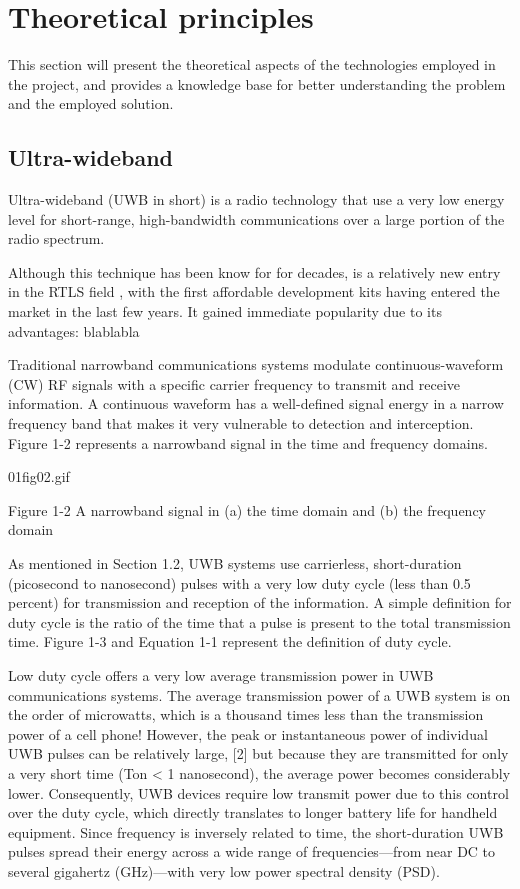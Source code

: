 \section{Theoretical principles}\label{sec:theory}
This section will present the theoretical aspects of the technologies employed in the project, and provides a knowledge base for better understanding the problem and the employed solution.


\subsection{Ultra-wideband}
Ultra-wideband (UWB in short) is a radio technology that use a very low energy level for short-range, high-bandwidth communications over a large portion of the radio spectrum.


Although this technique has been know for for decades, is a relatively new entry in the RTLS field \cite{uwb1}, with the first affordable development kits having entered the market in the last few years.
It gained immediate popularity due to its advantages: blablabla


Traditional narrowband communications systems modulate continuous-waveform (CW) RF signals with a specific carrier frequency to transmit and receive information. A continuous waveform has a well-defined signal energy in a narrow frequency band that makes it very vulnerable to detection and interception. Figure 1-2 represents a narrowband signal in the time and frequency domains.


      01fig02.gif

Figure 1-2 A narrowband signal in (a) the time domain and (b) the frequency domain

As mentioned in Section 1.2, UWB systems use carrierless, short-duration (picosecond to nanosecond) pulses with a very low duty cycle (less than 0.5 percent) for transmission and reception of the information. A simple definition for duty cycle is the ratio of the time that a pulse is present to the total transmission time. Figure 1-3 and Equation 1-1 represent the definition of duty cycle.

Low duty cycle offers a very low average transmission power in UWB communications systems. The average transmission power of a UWB system is on the order of microwatts, which is a thousand times less than the transmission power of a cell phone! However, the peak or instantaneous power of individual UWB pulses can be relatively large,
      [2]
     but because they are transmitted for only a very short time (Ton < 1 nanosecond), the average power becomes considerably lower. Consequently, UWB devices require low transmit power due to this control over the duty cycle, which directly translates to longer battery life for handheld equipment. Since frequency is inversely related to time, the short-duration UWB pulses spread their energy across a wide range of frequencies—from near DC to several gigahertz (GHz)—with very low power spectral density (PSD).




